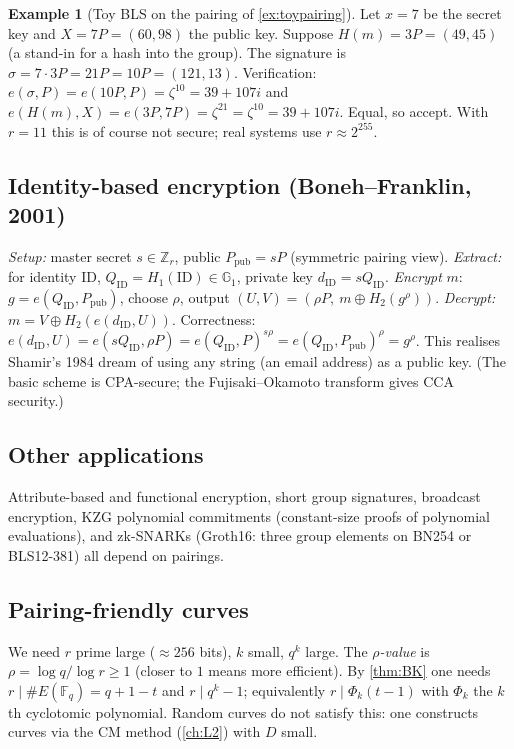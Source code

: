 \documentclass[11pt,a4paper,oneside]{book}
\theoremstyle{plain}
\theoremstyle{definition}
\newtheorem{example}[theorem]{Example}
\theoremstyle{remark}
\newcommand{\Z}{\mathbb{Z}}
\newcommand{\Fq}{\mathbb{F}_q}
\begin{document}
\begin{example}[Toy BLS on the pairing of \cref{ex:toypairing}]
Let $x=7$ be the secret key and $X=7P=(60,98)$ the public key. Suppose $H(m)=3P=(49,45)$ (a stand-in for a hash into the group). The signature is $\sigma=7\cdot3P=21P=10P=(121,13)$. Verification: $e(\sigma,P)=e(10P,P)=\zeta^{10}=39+107i$ and $e(H(m),X)=e(3P,7P)=\zeta^{21}=\zeta^{10}=39+107i$. Equal, so accept. With $r=11$ this is of course not secure; real systems use $r\approx2^{255}$.
\end{example}

\subsection{Identity-based encryption (Boneh--Franklin, 2001)}

\emph{Setup:} master secret $s\in\Z_r$, public $P_{\mathrm{pub}}=sP$ (symmetric pairing view). \emph{Extract:} for identity $\mathrm{ID}$, $Q_{\mathrm{ID}}=H_1(\mathrm{ID})\in\mathbb G_1$, private key $d_{\mathrm{ID}}=sQ_{\mathrm{ID}}$. \emph{Encrypt} $m$: $g=e(Q_{\mathrm{ID}},P_{\mathrm{pub}})$, choose $\rho$, output $(U,V)=(\rho P,\ m\oplus H_2(g^\rho))$. \emph{Decrypt:} $m=V\oplus H_2(e(d_{\mathrm{ID}},U))$.
Correctness: $e(d_{\mathrm{ID}},U)=e(sQ_{\mathrm{ID}},\rho P)=e(Q_{\mathrm{ID}},P)^{s\rho}=e(Q_{\mathrm{ID}},P_{\mathrm{pub}})^\rho=g^\rho$. This realises Shamir's 1984 dream of using any string (an email address) as a public key. (The basic scheme is CPA-secure; the Fujisaki--Okamoto transform gives CCA security.)

\subsection{Other applications}

Attribute-based and functional encryption, short group signatures, broadcast encryption, KZG polynomial commitments (constant-size proofs of polynomial evaluations), and zk-SNARKs (Groth16: three group elements on BN254 or BLS12-381) all depend on pairings.

\subsection{Pairing-friendly curves}

We need $r$ prime large ($\approx256$ bits), $k$ small, $q^k$ large. The \emph{$\rho$-value} is $\rho=\log q/\log r\ge1$ (closer to $1$ means more efficient). By \cref{thm:BK} one needs $r\mid\#E(\Fq)=q+1-t$ and $r\mid q^k-1$; equivalently $r\mid\Phi_k(t-1)$ with $\Phi_k$ the $k$th cyclotomic polynomial. Random curves do not satisfy this: one constructs curves via the CM method (\cref{ch:L2}) with $D$ small.
\end{document}

